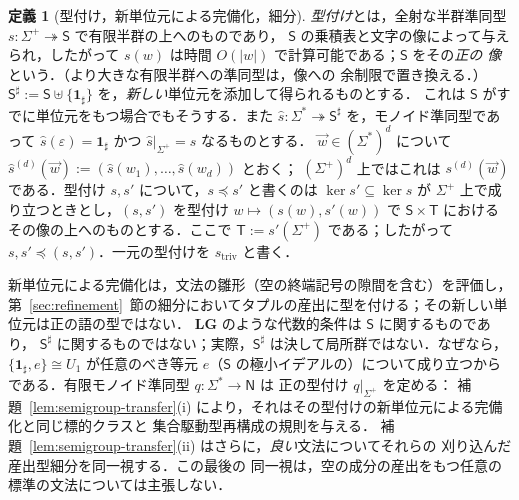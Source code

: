 \documentclass[11pt,a4paper]{ltjsarticle}
\numberwithin{equation}{section}
\theoremstyle{plain}
\theoremstyle{definition}
\newtheorem{definition}[theorem]{定義}
\theoremstyle{remark}
\newcommand{\tuple}[1]{\vec{#1}}
\newcommand{\eps}{\varepsilon}
\theoremstyle{plain}
\begin{document}
\begin{definition}[型付け，新単位元による完備化，細分]
\label{def-monoid-morphism}
\label{def:semigroup-typing}
\label{def:h-refinement}
\emph{型付け}とは，全射な半群準同型
$s:\Sigma^+\twoheadrightarrow\mathsf S$ で有限半群の上へのものであり，
$\mathsf S$ の乗積表と文字の像によって与えられ，したがって
$s(w)$ は時間 $O(|w|)$ で計算可能である；$\mathsf S$ をその\emph{正の
像}という．（より大きな有限半群への準同型は，像への
余制限で置き換える．）$\mathsf S^\sharp:=\mathsf
S\uplus\{\mathbf1_\sharp\}$ を，\emph{新しい}単位元を添加して得られるものとする．
これは $\mathsf S$ がすでに単位元をもつ場合でもそうする．また
$\widehat{s}:\Sigma^*\twoheadrightarrow\mathsf S^\sharp$ を，モノイド準同型であって
$\widehat{s}(\eps)=\mathbf1_\sharp$ かつ $\widehat{s}|_{\Sigma^+}=s$ なるものとする．
$\tuple w\in(\Sigma^*)^d$ について
$\widehat{s}^{(d)}(\tuple w):=(\widehat{s}(w_1),\ldots,\widehat{s}(w_d))$ とおく；
$(\Sigma^+)^d$ 上ではこれは $s^{(d)}(\tuple w)$ である．型付け $s,s'$ について，$s\preceq
s'$ と書くのは $\ker s'\subseteq\ker s$ が $\Sigma^+$ 上で成り立つときとし，$(s,s')$ を型付け
$w\mapsto(s(w),s'(w))$ で $\mathsf S\times\mathsf T$ におけるその像の上へのものとする．ここで $\mathsf T:=s'(\Sigma^+)$ である；したがって
$s,s'\preceq(s,s')$．一元の型付けを $s_{\mathrm{triv}}$ と書く．
\end{definition}

新単位元による完備化は，文法の雛形（空の終端記号の隙間を含む）を評価し，
第~\ref{sec:refinement}~節の細分においてタプルの産出に型を付ける；その新しい単位元は正の語の型ではない．
$\mathbf{LG}$ のような代数的条件は $\mathsf S$ に関するものであり，
$\mathsf S^\sharp$ に関するものではない；実際，$\mathsf S^\sharp$ は決して局所群ではない．なぜなら，
$\{\mathbf1_\sharp,e\}\cong U_1$ が任意のべき等元 $e$（$\mathsf S$ の極小イデアルの）について成り立つからである．有限モノイド準同型 $q:\Sigma^*\to\mathsf N$ は
正の型付け $q|_{\Sigma^+}$ を定める：
補題~\ref{lem:semigroup-transfer}(i) により，それはその型付けの新単位元による完備化と同じ標的クラスと
集合駆動型再構成の規則を与える．
補題~\ref{lem:semigroup-transfer}(ii) はさらに，\emph{良い}文法についてそれらの
刈り込んだ産出型細分を同一視する．この最後の
同一視は，空の成分の産出をもつ任意の標準の文法については主張しない．
\end{document}

